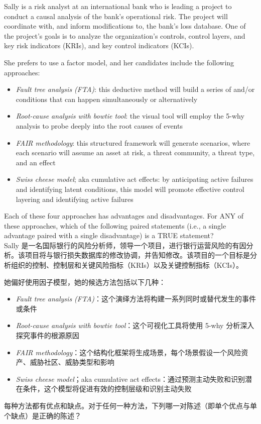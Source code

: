 \documentclass{article}
\newcounter{question} %
\begin{document}
\begin{question}
    Sally is a risk analyst at an international bank who is leading a project to conduct a causal analysis of the bank’s operational risk. The project will coordinate with, and inform modifications to, the bank’s loss database. One of the project’s goals is to analyze the organization’s controls, control layers, and key risk indicators (KRIs), and key control indicators (KCIs).

    She prefers to use a factor model, and her candidates include the following approaches:
    \begin{itemize}
        \item \textit{Fault tree analysis (FTA)}: this deductive method will build a series of and/or conditions that can happen simultaneously or alternatively
        \item \textit{Root-cause analysis with bowtie tool}: the visual tool will employ the 5-why analysis to probe deeply into the root causes of events
        \item \textit{FAIR methodology}: this structured framework will generate scenarios, where each scenario will assume an asset at risk, a threat community, a threat type, and an effect
        \item \textit{Swiss cheese model}; aka cumulative act effects: by anticipating active failures and identifying latent conditions, this model will promote effective control layering and identifying active failures
    \end{itemize}

    Each of these four approaches has advantages and disadvantages. For ANY of these approaches, which of the following paired statements (i.e., a single advantage paired with a single disadvantage) is a TRUE statement?\\
    Sally 是一名国际银行的风险分析师，领导一个项目，进行银行运营风险的有因分析。该项目将与银行损失数据库的修改协调，并告知修改。该项目的一个目标是分析组织的控制、控制层和关键风险指标（KRIs）以及关键控制指标（KCIs）。

    她偏好使用因子模型，她的候选方法包括以下几种：
    \begin{itemize}
        \item \textit{Fault tree analysis (FTA)}：这个演绎方法将构建一系列同时或替代发生的事件或条件
        \item \textit{Root-cause analysis with bowtie tool}：这个可视化工具将使用 5-why 分析深入探究事件的根源原因
        \item \textit{FAIR methodology}：这个结构化框架将生成场景，每个场景假设一个风险资产、威胁社区、威胁类型和影响
        \item \textit{Swiss cheese model}；aka cumulative act effects：通过预测主动失败和识别潜在条件，这个模型将促进有效的控制层级和识别主动失败
    \end{itemize}

    每种方法都有优点和缺点。对于任何一种方法，下列哪一对陈述（即单个优点与单个缺点）是正确的陈述？
\end{question}
\end{document}
